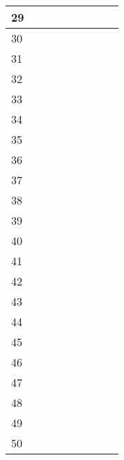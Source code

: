 \begin{table}[H]
\begin{tabularx}{\textwidth}[ht]{|l|X|X|X|X|X|X|X|X|}
		29 &  &  &  &  &  & \centering \checkmark \tabularnewline \hline
		30 &  & \centering \checkmark &  &  &  & \tabularnewline \hline
		31 & \centering \checkmark &  &  &  &  & \tabularnewline \hline
		32 &  & \centering \checkmark &  &  &  & \tabularnewline \hline
		33 & \centering \checkmark &  &  &  &  & \tabularnewline \hline
		34 & \centering \checkmark &  &  & \centering \checkmark &  & \tabularnewline \hline
		35 & \centering \checkmark &  &  &  &  & \tabularnewline \hline
		36 & \centering \checkmark &  & \centering \checkmark &  &  & \tabularnewline \hline
		37 & \centering \checkmark &  & \centering \checkmark &  &  & \tabularnewline \hline
		38 & \centering \checkmark &  &  &  &  & \tabularnewline \hline
		39 &  & \centering \checkmark &  &  &  & \tabularnewline \hline
		40 & \centering \checkmark &  &  &  &  & \tabularnewline \hline
		41 & \centering \checkmark &  &  &  &  & \tabularnewline \hline
		42 &  &  &  &  &  & \centering \checkmark \tabularnewline \hline
		43 &  &  &  &  &  & \centering \checkmark \tabularnewline \hline
		44 & \centering \checkmark &  &  &  &  & \tabularnewline \hline
		45 &  & \centering \checkmark &  &  & \centering \checkmark & \tabularnewline \hline
		46 & \centering \checkmark &  &  &  &  & \tabularnewline \hline
		47 & \centering \checkmark &  &  &  &  & \tabularnewline \hline
		48 &  & \centering \checkmark &  &  &  & \tabularnewline \hline
		49 &  & \centering \checkmark &  &  &  & \tabularnewline \hline
		50 &  & \centering \checkmark &  &  &  & \tabularnewline \hline
	\end{tabularx}
\end{table}

